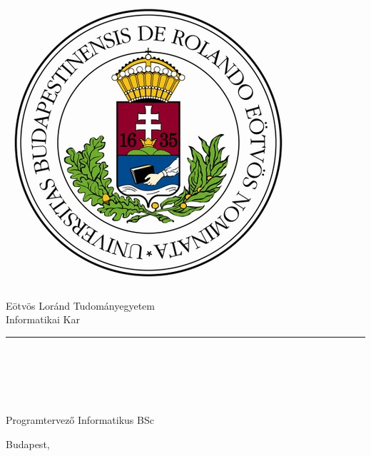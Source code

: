 \begin{titlepage}

\begin{minipage}{0.40\linewidth}
\includegraphics[scale=0.3]{img/elte-cimer}
\end{minipage}
\begin{minipage}{0.50\linewidth}
\begin{center}
Eötvös Loránd Tudományegyetem \\
Informatikai Kar \\
\TANSZEK
\end{center}
\end{minipage}

\hrule
\vfill

\begin{center}
\Huge
\textbf{\CIM}
\normalsize
\end{center}

\vfill

\begin{minipage}[t]{0.5\linewidth}
\begin{flushleft}
\textbf{\TEMAVEZETOKULSO} \\
\TEMAVEZETOBEOSZTASKULSO\\
\textbf{\TEMAVEZETO} \\
\TEMAVEZETOBEOSZTAS

\end{flushleft}
\end{minipage}
\begin{minipage}[t]{0.5\linewidth}
\begin{flushright}
\textbf{\SZERZO} \\
Programtervező Informatikus BSc
\end{flushright}
\end{minipage}

\vfill

\begin{center}
Budapest, \VEDESEVE
\end{center}

\end{titlepage}

